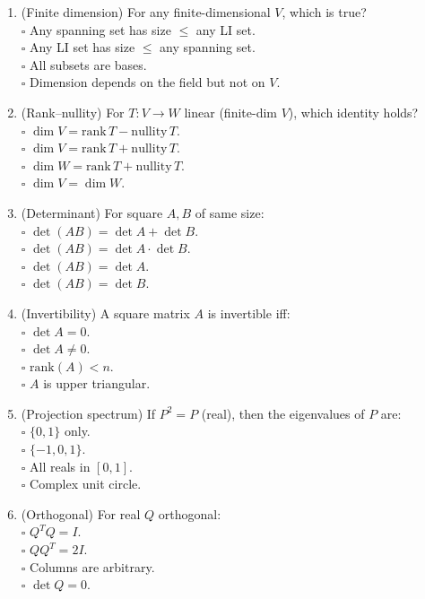 \documentclass[11pt]{article}
\begin{document}
\begin{enumerate}
\item (Finite dimension) For any finite-dimensional $V$, which is true?\\
\(\square\) Any spanning set has size $\le$ any LI set.\\
\(\square\) Any LI set has size $\le$ any spanning set.\\
\(\square\) All subsets are bases.\\
\(\square\) Dimension depends on the field but not on $V$.

\item (Rank–nullity) For $T:V\to W$ linear (finite-dim $V$), which identity holds?\\
\(\square\) $\dim V=\mathrm{rank}\,T-\mathrm{nullity}\,T$.\\
\(\square\) $\dim V=\mathrm{rank}\,T+\mathrm{nullity}\,T$.\\
\(\square\) $\dim W=\mathrm{rank}\,T+\mathrm{nullity}\,T$.\\
\(\square\) $\dim V=\dim W$.

\item (Determinant) For square $A,B$ of same size:\\
\(\square\) $\det(AB)=\det A+\det B$.\\
\(\square\) $\det(AB)=\det A\cdot\det B$.\\
\(\square\) $\det(AB)=\det A$.\\
\(\square\) $\det(AB)=\det B$.

\item (Invertibility) A square matrix $A$ is invertible iff:\\
\(\square\) $\det A=0$.\\
\(\square\) $\det A\neq 0$.\\
\(\square\) $\mathrm{rank}(A)<n$.\\
\(\square\) $A$ is upper triangular.

\item (Projection spectrum) If $P^2=P$ (real), then the eigenvalues of $P$ are:\\
\(\square\) $\{0,1\}$ only.\\
\(\square\) $\{-1,0,1\}$.\\
\(\square\) All reals in $[0,1]$.\\
\(\square\) Complex unit circle.

\item (Orthogonal) For real $Q$ orthogonal:\\
\(\square\) $Q^TQ=I$.\\
\(\square\) $QQ^T=2I$.\\
\(\square\) Columns are arbitrary.\\
\(\square\) $\det Q=0$.


\end{enumerate}
\end{document}
